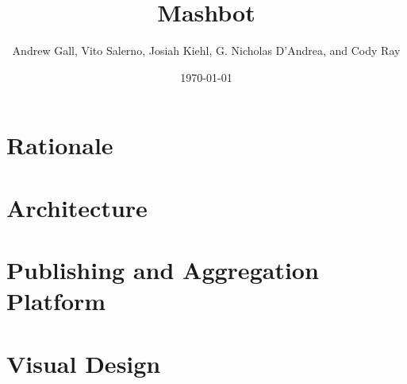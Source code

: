 \documentclass{beamer}
\begin{document}
	\title{Mashbot}
	\author{Andrew Gall, Vito Salerno, Josiah Kiehl, G. Nicholas D'Andrea, and Cody Ray}
	\date{\today}

	\frame{\titlepage}
	
	\section{Rationale}
		\frame{
			\frametitle{}
		
		}
		\frame{
			\frametitle{}
		
		}
		\frame{
			\frametitle{}
		
		}
		\frame{
			\frametitle{}
		
		}

	\section{Architecture}
		\frame{
			\frametitle{}
		
		}
		\frame{
			\frametitle{}
		
		}
		\frame{
			\frametitle{}
		
		}
		\frame{
			\frametitle{}
		
		}
		\frame{
			\frametitle{}
		
		}

	\section{Publishing and Aggregation Platform}
		\frame{
			\frametitle{}
		
		}
		\frame{
			\frametitle{}
		
		}
		\frame{
			\frametitle{}
		
		}
		\frame{
			\frametitle{}
		
		}

	\section{Visual Design}
		\frame{
			\frametitle{}
		
		}
		\frame{
			\frametitle{}
		
		}
		\frame{
			\frametitle{}
		
		}
		\frame{
			\frametitle{}
		
		}
		\frame{
			\frametitle{}
		
		}
	
\end{document}

